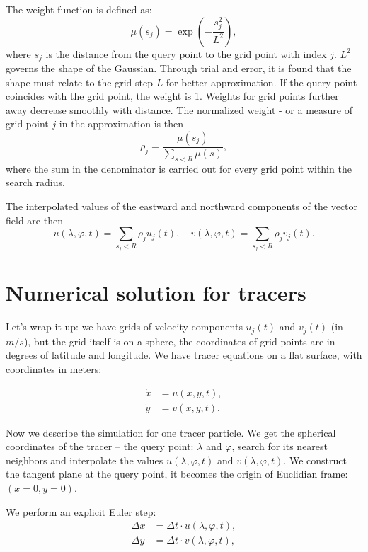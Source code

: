 \documentclass[12pt]{article}
\begin{document}
The weight function is defined as:
\begin{equation}
\mu(s_j)=\exp\left(-\frac{s_j^2}{L^2}\right),
\end{equation}
where $s_j$ is the distance from the query point to the grid point with index $j$. $L^2$ governs the shape of the Gaussian. Through trial and error, it is found that the shape must relate to the grid step $L$ for better approximation. If the query point coincides with the grid point, the weight is 1. Weights for grid points further away decrease smoothly with distance. The normalized weight - or a measure of grid point $j$ in the approximation is then
\begin{equation}
\rho_j=\frac{\mu(s_j)}{\sum_{s<R} \mu(s)},
\end{equation}
where the sum in the denominator is carried out for every grid point within the search radius.

The interpolated values of the eastward and northward components of the vector field are then
\begin{equation}
u(\lambda,\varphi,t)=\sum_{s_j<R} \rho_j u_j (t), \quad v(\lambda,\varphi,t)=\sum_{s_j<R} \rho_j v_j (t).
\end{equation}

\section{Numerical solution for tracers}


Let's wrap it up: we have grids of velocity components $u_j (t)$ and $v_j (t)$ (in $m/s$), but the grid itself is on a sphere, the coordinates of grid points are in degrees of latitude and longitude. 
We have tracer equations on a flat surface, with coordinates in meters:

\begin{equation}
\begin{aligned}
\dot{x}&=u(x,y,t),\\
\dot{y}&=v(x,y,t).
\end{aligned}
\end{equation}

Now we describe the simulation for one tracer particle.
We get the spherical coordinates of the tracer -- the query point: $\lambda$ and $\varphi$, search for its nearest neighbors and interpolate the values $u(\lambda,\varphi,t)$ and $v(\lambda,\varphi,t)$.
We construct the tangent plane at the query point, it becomes the origin of Euclidian frame: $(x=0,y=0)$.

We perform an explicit Euler step:
\begin{equation}
\begin{aligned}
\Delta x&=\Delta t \cdot u(\lambda,\varphi,t),\\
\Delta y&=\Delta t \cdot v(\lambda,\varphi,t),
\end{aligned}
\end{equation}
\end{document}
